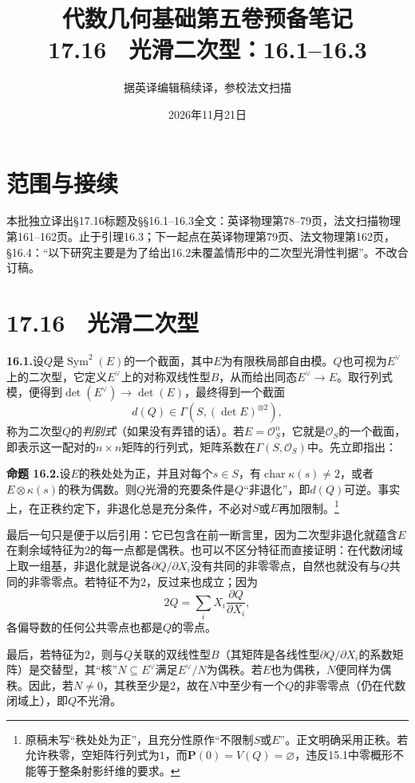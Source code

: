 \documentclass[openany,fontset=fandol]{ctexbook}
\newcommand{\OO}{\mathcal O}
\DeclareMathOperator{\Sym}{Sym}
\begin{document}
\title{代数几何基础第五卷预备笔记\\17.16　光滑二次型：16.1--16.3}
\author{据英译编辑稿续译，参校法文扫描}
\date{2026年11月21日}
\maketitle
\chapter*{范围与接续}
本批独立译出§17.16标题及§§16.1--16.3全文：英译物理第78--79页，法文扫描物理第161--162页。止于引理16.3；下一起点在英译物理第79页、法文物理第162页，§16.4：“以下研究主要是为了给出16.2未覆盖情形中的二次型光滑性判据”。不改合订稿。
\chapter*{17.16　光滑二次型}
\noindent\textbf{16.1.}\quad 设$Q$是$\Sym^2(E)$的一个截面，其中$E$为有限秩局部自由模。$Q$也可视为$E^\vee$上的二次型，它定义$E^\vee$上的对称双线性型$B$，从而给出同态$E^\vee\to E$。取行列式模，便得到$\det(E^\vee)\to\det(E)$，最终得到一个截面
\[
d(Q)\in\Gamma\!\left(S,(\det E)^{\otimes 2}\right),
\]
称为二次型$Q$的\emph{判别式}（如果没有弄错的话）。若$E=\OO_S^n$，它就是$\OO_S$的一个截面，即表示这一配对的$n\times n$矩阵的行列式，矩阵系数在$\Gamma(S,\OO_S)$中。先立即指出：

\noindent\textbf{命题 16.2.}\quad 设$E$的秩处处为正，并且对每个$s\in S$，有$\operatorname{char}\kappa(s)\ne2$，或者$E\otimes\kappa(s)$的秩为偶数。则$Q$光滑的充要条件是$Q$“非退化”，即$d(Q)$可逆。事实上，在正秩约定下，非退化总是充分条件，不必对$S$或$E$再加限制。\footnote{原稿未写“秩处处为正”，且充分性原作“不限制$S$或$E$”。正文明确采用正秩。若允许秩零，空矩阵行列式为$1$，而$\mathbf P(0)=V(Q)=\varnothing$，违反15.1中零概形不能等于整条射影纤维的要求。}

最后一句只是便于以后引用：它已包含在前一断言里，因为二次型非退化就蕴含$E$在剩余域特征为$2$的每一点都是偶秩。也可以不区分特征而直接证明：在代数闭域上取一组基，非退化就是说各$\partial Q/\partial X_i$没有共同的非零零点，自然也就没有与$Q$共同的非零零点。若特征不为$2$，反过来也成立；因为
\[
2Q=\sum_i X_i\frac{\partial Q}{\partial X_i},
\]
各偏导数的任何公共零点也都是$Q$的零点。

最后，若特征为$2$，则与$Q$关联的双线性型$B$（其矩阵是各线性型$\partial Q/\partial X_i$的系数矩阵）是交替型，其“核”$N\subseteq E^\vee$满足$E^\vee/N$为偶秩。若$E$也为偶秩，$N$便同样为偶秩。因此，若$N\ne0$，其秩至少是$2$，故在$N$中至少有一个$Q$的非零零点（仍在代数闭域上），即$Q$不光滑。
\end{document}
